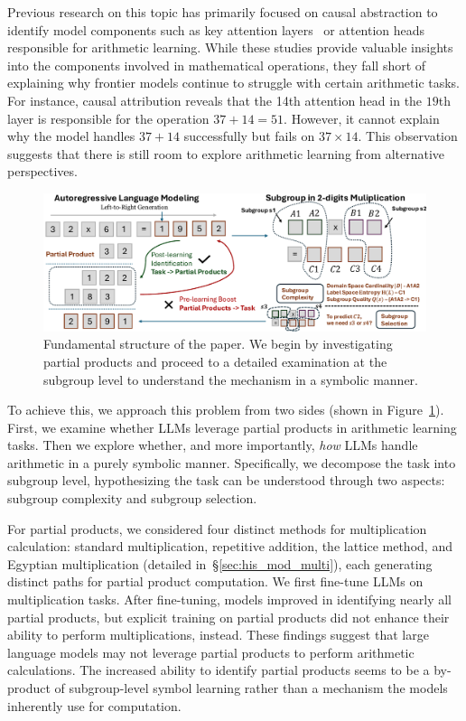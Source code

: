 \documentclass[11pt]{article}
\begin{document}
Previous research on this topic has primarily focused on causal abstraction to identify model components such as key attention layers~\citep{stolfo-etal-2023-mechanistic} or attention heads~\citep{zhang2024interpretingimprovinglargelanguage} responsible for arithmetic learning.  While these studies provide valuable insights into the components involved in mathematical operations, they fall short of explaining why frontier models continue to struggle with certain arithmetic tasks. For instance, causal attribution reveals that the 14th attention head in the $19$th layer is responsible for the operation $37 + 14 = 51$. 
However, it cannot explain why the model handles $37 + 14$ successfully but fails on $37 \times 14$. This observation suggests that there is still room to explore arithmetic learning from alternative perspectives.
\begin{figure}[t]
\vspace{-0.3cm}
\begin{center}
        \centering 
        \includegraphics[width=\linewidth]{figure/intro.pdf}
        \caption{Fundamental structure of the paper. We begin by investigating partial products and proceed to a detailed examination at the subgroup level to understand the mechanism in a symbolic manner.}
        \label{fig:flowchart}
\end{center}
\vspace{-0.8cm}
\end{figure}

To achieve this, we approach this problem from two sides (shown in Figure~\ref{fig:flowchart}). First, we examine whether LLMs leverage partial products in arithmetic learning tasks. Then we explore whether, and more importantly, \textit{how} LLMs handle arithmetic in a purely symbolic manner. Specifically, we decompose the task into subgroup level, hypothesizing the task can be understood through two aspects: subgroup complexity and subgroup selection.

For partial products, we considered four distinct methods for multiplication calculation: standard multiplication, repetitive addition, the lattice method, and Egyptian multiplication (detailed in~\S\ref{sec:his_mod_multi}), each generating distinct paths for partial product computation. We first fine-tune LLMs on multiplication tasks. After fine-tuning, models improved in identifying nearly all partial products, but explicit training on partial products did not enhance their ability to perform multiplications, instead. These findings suggest that large language models may not leverage partial products to perform arithmetic calculations. The increased ability to identify partial products seems to be a by-product of subgroup-level symbol learning rather than a mechanism the models inherently use for computation.
\end{document}
